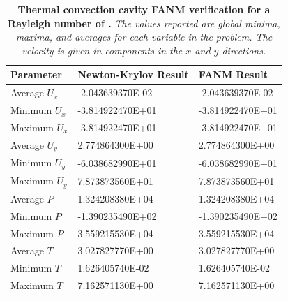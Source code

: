 \begin{table}[h!]
  \begin{center}
    \begin{tabular}{lll}\hline\hline
      \multicolumn{1}{l}{Parameter}& 
      \multicolumn{1}{l}{Newton-Krylov Result}&
      \multicolumn{1}{l}{FANM Result}\\
      \hline
      Average $U_x$ & -2.043639370E-02 & -2.043639370E-02 \\
      Minimum $U_x$ & -3.814922470E+01 & -3.814922470E+01 \\
      Maximum $U_x$ & -3.814922470E+01 & -3.814922470E+01 \\
      \hline
      Average $U_y$ & 2.774864300E+00 & 2.774864300E+00 \\
      Minimum $U_y$ & -6.038682990E+01 & -6.038682990E+01 \\
      Maximum $U_y$ & 7.873873560E+01 & 7.873873560E+01 \\
      \hline
      Average $P$ & 1.324208380E+04 & 1.324208380E+04 \\
      Minimum $P$ & -1.390235490E+02 & -1.390235490E+02 \\
      Maximum $P$ & 3.559215530E+04 & 3.559215530E+04 \\
      \hline
      Average $T$ & 3.027827770E+00 & 3.027827770E+00 \\
      Minimum $T$ & 1.626405740E-02 & 1.626405740E-02 \\
      Maximum $T$ & 7.162571130E+00 & 7.162571130E+00 \\
      \hline\hline
    \end{tabular}
  \end{center}
  \caption{\textbf{Thermal convection cavity FANM verification for a
      Rayleigh number of .} \textit{The values reported are
      global minima, maxima, and averages for each variable in the
      problem. The velocity is given in components in the $x$ and $y$
      directions.}}
  \label{tab:convection_ra1e5_results}
\end{table}

